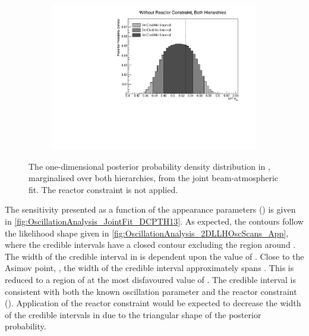 \begin{figure}[h]
  \begin{subfigure}[t]{0.98\textwidth}
    \includegraphics[width=\textwidth, trim={0mm 0mm 0mm 0mm}, clip,page=1]{Figures/OA/JointFit/Contours_1D_th23_BH_1_woRC_UnSmeared_CredibleInterval.pdf}
  \end{subfigure}
  \caption{The one-dimensional posterior probability density distribution in , marginalised over both hierarchies, from the joint beam-atmospheric fit. The reactor constraint is not applied.}
  \label{fig:OscillationAnalysis_JointFit_TH23}
\end{figure}

The sensitivity presented as a function of the appearance parameters () is given in \autoref{fig:OscillationAnalysis_JointFit_DCPTH13}. As expected, the contours follow the likelihood shape given in \autoref{fig:OscillationAnalysis_2DLLHOscScans_App}, where the \quickmath{2\sigma} credible intervals have a closed contour excluding the region around . The width of the \quickmath{3\sigma} credible interval in  is dependent upon the value of . Close to the Asimov point, , the width of the \quickmath{3\sigma} credible interval approximately spans . This is reduced to a region of  at the most disfavoured value of .
The \quickmath{1\sigma} credible interval is consistent with both the known oscillation parameter and the reactor constraint (). Application of the reactor constraint would be expected to decrease the width of the \quickmath{1\sigma} credible intervals in  due to the triangular shape of the posterior probability. 

